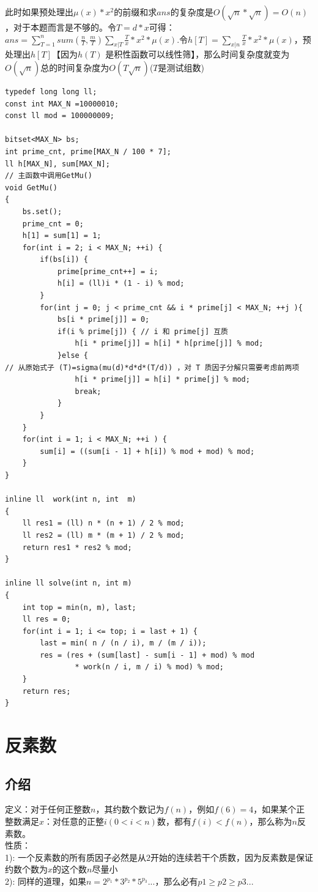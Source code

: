 此时如果预处理出$\mu(x) * x^2$的前缀和求$ans$的复杂度是$O(\sqrt {n} *\sqrt{n})=O(n)$，对于本题而言是不够的。令$T= d*x$可得：$ans= \sum_{T=1}^{n}sum(\frac{n}{T},\frac{m}{T})\sum_{x|T}\frac{T}{x}*x^2*\mu(x)$.令$h[T] = \sum_{x|n}\frac{T}{x}*x^2*\mu(x)$，预处理出$h[T]$【因为$h(T)$ 是积性函数可以线性筛】，那么时间复杂度就变为$O(\sqrt n)$总的时间复杂度为$O(T\sqrt n)$($T$是测试组数)

\begin{lstlisting}
typedef long long ll;
const int MAX_N =10000010;
const ll mod = 100000009;

bitset<MAX_N> bs;
int prime_cnt, prime[MAX_N / 100 * 7];
ll h[MAX_N], sum[MAX_N];
// 主函数中调用GetMu()
void GetMu()
{
	bs.set();
	prime_cnt = 0;
	h[1] = sum[1] = 1;
	for(int i = 2; i < MAX_N; ++i) {
		if(bs[i]) {
			prime[prime_cnt++] = i;
			h[i] = (ll)i * (1 - i) % mod;
		}
		for(int j = 0; j < prime_cnt && i * prime[j] < MAX_N; ++j ){
			bs[i * prime[j]] = 0;
			if(i % prime[j]) { // i 和 prime[j] 互质
				h[i * prime[j]] = h[i] * h[prime[j]] % mod;
			}else {
// 从原始式子 (T)=sigma(mu(d)*d*d*(T/d)) ，对 T 质因子分解只需要考虑前两项
				h[i * prime[j]] = h[i] * prime[j] % mod;
				break;
			}
		}
	}
	for(int i = 1; i < MAX_N; ++i ) {
		sum[i] = ((sum[i - 1] + h[i]) % mod + mod) % mod;
	}
}

inline ll  work(int n, int  m)
{
	ll res1 = (ll) n * (n + 1) / 2 % mod;
	ll res2 = (ll) m * (m + 1) / 2 % mod;
	return res1 * res2 % mod;	
}

inline ll solve(int n, int m)
{
	int top = min(n, m), last;
	ll res = 0;
	for(int i = 1; i <= top; i = last + 1) {
		last = min( n / (n / i), m / (m / i));
		res = (res + (sum[last] - sum[i - 1] + mod) % mod
                * work(n / i, m / i) % mod) % mod;
	}
	return res;
}
\end{lstlisting}

\section{反素数}
\subsection{介绍}
定义：对于任何正整数$n$，其约数个数记为$f(n)$，例如$f(6)=4$，如果某个正整数满足$x$：对任意的正整$i(0 < i<n)$数，都有$f(i) < f(n)$，那么称为$n$反素数。 \\
性质： \\
1): 一个反素数的所有质因子必然是从$2$开始的连续若干个质数，因为反素数是保证约数个数为$x$的这个数$n$尽量小 \\
2): 同样的道理，如果$n=2^{p_1}*3^{p_2}*5^{p_3}...$，那么必有$p1\geq p2\geq p3...$ \\

